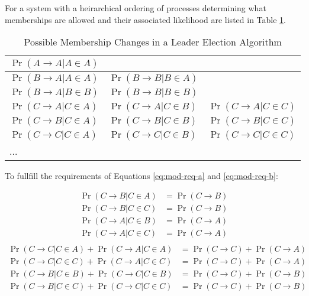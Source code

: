 For a system with a heirarchical ordering of processes determining what memberships are allowed and their associated likelihood are listed in Table \ref{tab:membership-probs}.

\begin{table}
\centering
\caption{Possible Membership Changes in a Leader Election Algorithm}
\label{tab:membership-probs}
\begin{tabular}{l l l}
$\Pr(A \rightarrow A | A \in A)$ & & \\ \hline
$\Pr(B \rightarrow A | A \in A)$ & $\Pr(B \rightarrow B | B \in A)$ & \\
$\Pr(B \rightarrow A | B \in B)$ & $\Pr(B \rightarrow B | B \in B)$ & \\ \hline
$\Pr(C \rightarrow A | C \in A)$ & $\Pr(C \rightarrow A | C \in B)$ & $\Pr(C \rightarrow A | C \in C)$ \\
$\Pr(C \rightarrow B | C \in A)$ & $\Pr(C \rightarrow B | C \in B)$ & $\Pr(C \rightarrow B | C \in C)$ \\
$\Pr(C \rightarrow C | C \in A)$ & $\Pr(C \rightarrow C | C \in B)$ & $\Pr(C \rightarrow C | C \in C)$ \\ \hline
... & & \\
\end{tabular}
\end{table}

To fullfill the requirements of Equations \ref{eq:mod-req-a} and \ref{eq:mod-req-b}:

\begin{equation}
\begin{split}
\Pr(C \rightarrow B| C \in A) &= \Pr(C \rightarrow B) \\
\Pr(C \rightarrow B| C \in C) &= \Pr(C \rightarrow B) \\
\Pr(C \rightarrow A| C \in B) &= \Pr(C \rightarrow A) \\
\Pr(C \rightarrow A | C \in C) &= \Pr(C \rightarrow A) \\
\end{split}
\end{equation}
\begin{equation}
\begin{split}
\Pr(C \rightarrow C | C \in A) + \Pr(C \rightarrow A | C \in A) &= \Pr(C \rightarrow C) + \Pr(C \rightarrow A) \\
\Pr(C \rightarrow C | C \in C) + \Pr(C \rightarrow A | C \in C) &= \Pr(C \rightarrow C) + \Pr(C \rightarrow A) \\
\Pr(C \rightarrow  B | C \in B) + \Pr(C \rightarrow C | C \in B) &= \Pr(C \rightarrow C) + \Pr(C \rightarrow B) \\
\Pr(C \rightarrow B | C \in C) + \Pr(C \rightarrow C | C \in C) &= \Pr(C \rightarrow C) + \Pr(C \rightarrow B)
\end{split}
\end{equation}

